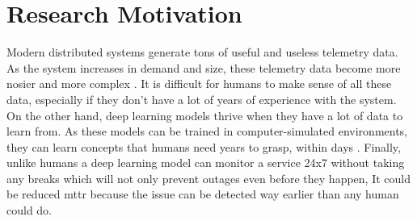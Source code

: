 \section{Research Motivation}

Modern distributed systems generate tons of useful and useless telemetry data. As the system increases in demand and size, these telemetry data become more nosier and more complex \citep{Untangli35:online}. It is difficult for humans to make sense of all these data, especially if they don't have a lot of years of experience with the system. On the other hand, deep learning models thrive when they have a lot of data to learn from. As these models can be trained in computer-simulated environments, they can learn concepts that humans need years to grasp, within days \citep{OpenAI_dota, silver2017mastering}. Finally, unlike humans a deep learning model can monitor a service 24x7 without taking any breaks which will not only prevent outages even before they happen, It could be reduced \ac{mttr} because the issue can be detected way earlier than any human could do. 